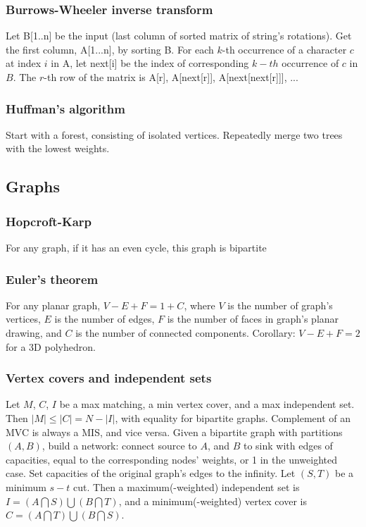 \documentclass[a4paper,12pt]{article}
\newcommand\includefile[4]{
  \subsubsection{#2}
  \begin{multicols}{2}
    
  \end{multicols}
}
\begin{document}
\newpage
\subsubsection{Burrows-Wheeler inverse transform}
Let B[1..n] be the input (last column of sorted matrix of string's rotations). Get the first column, A[1...n], by sorting B. For each $k$-th occurrence of a character $c$ at index $i$ in A, let next[i] be the index of corresponding $k-th$ occurrence of $c$ in $B$. The $r$-th row of the matrix is A[r], A[next[r]], A[next[next[r]]], ... 

\subsubsection{Huffman's algorithm}
Start with a forest, consisting of isolated vertices. Repeatedly merge two trees with the lowest weights.


\newpage

\subsection{Graphs}
\includefile{c++}{Hopcroft-Karp}{graph}{bip_match.cpp}
For any graph, if it has an even cycle, this graph is bipartite

\newpage
\subsubsection{Euler’s theorem}
For any planar graph, $V - E + F = 1 + C$, where $V$ is the number of graph’s vertices, $E$ is the number of edges, $F$ is the number of faces in graph’s planar drawing,
and $C$ is the number of connected components. Corollary: $V - E + F = 2$ for a 3D polyhedron.

\subsubsection{Vertex covers and independent sets}
Let $M$, $C$, $I$ be a max matching, a min vertex cover, and a max independent set. Then $|M| \leq |C| = N - |I|$, with equality for bipartite graphs. Complement of an MVC is always a MIS, and vice versa.
Given a bipartite graph with partitions $(A,B)$, build a network: connect source to $A$, and $B$ to sink with edges of capacities, equal to the corresponding nodes’ weights, or 1 in the unweighted case.
Set capacities of the original graph’s edges to the infinity. Let $(S,T)$ be a minimum $s-t$ cut. 
Then a maximum(-weighted) independent set is $I = (A \bigcap S) \bigcup (B \bigcap T)$, and a minimum(-weighted) vertex cover is $C = (A \bigcap T) \bigcup (B \bigcap S)$.
\end{document}
